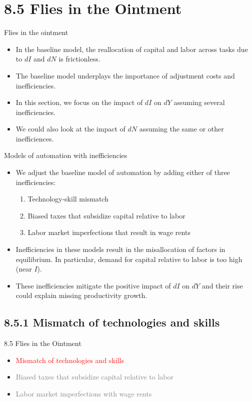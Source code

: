 \documentclass[notes=show]{beamer}
\begin{document}
\section{8.5 Flies in the Ointment}

\begin{frame}{Flies in the ointment}
\begin{itemize}
\item In the baseline model, the reallocation of capital and labor across tasks due to $dI$ and $dN$ is frictionless. \medskip 
\item The baseline model underplays the importance of adjustment costs and inefficiencies. \medskip
\item In this section, we focus on the impact of $dI$ on $dY$ assuming several inefficiencies. \medskip
\item We could also look at the impact of $dN$ assuming the same or other inefficiences.
\end{itemize}
\end{frame}

\begin{frame}{Models of automation with inefficiencies}
\begin{itemize}
\item We adjust the baseline model of automation by adding either of three inefficiencies: \medskip
\begin{enumerate}
\item Technology-skill mismatch \medskip
\item Biased taxes that subsidize capital relative to labor \medskip
\item Labor market imperfections that result in wage rents \medskip
\end{enumerate}
\item Inefficiencies in these models result in the misallocation of factors in equilibrium. In particular, demand for capital relative to labor is too high (near $I$). \medskip
\item These inefficiencies mitigate the positive impact of $dI$ on $dY$ and their rise could explain missing productivity growth.
\end{itemize}
\end{frame}

\subsection{8.5.1 Mismatch of technologies and skills}

\begin{frame}{8.5 Flies in the Ointment}
\begin{itemize}
\item[\textcolor{red}{8.5.1}] \textcolor{red}{Mismatch of technologies and skills} \bigskip
\item[\textcolor{gray}{8.5.2}] \textcolor{gray}{Biased taxes that subsidize capital relative to labor} \bigskip
\item[\textcolor{gray}{8.5.3}] \textcolor{gray}{Labor market imperfections with wage rents}
\end{itemize}
\end{frame}
\end{document}

